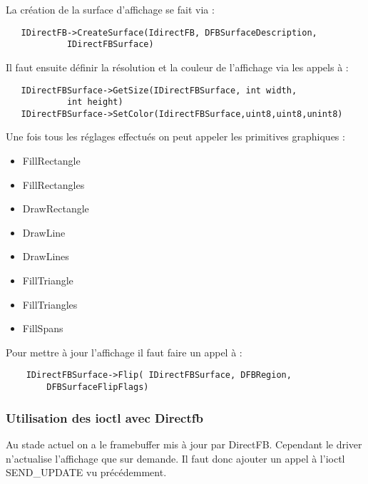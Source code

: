 La création de la surface d'affichage se fait via : 
	\begin{lstlisting}
   IDirectFB->CreateSurface(IdirectFB, DFBSurfaceDescription, 
			IDirectFBSurface)
	\end{lstlisting}

Il faut ensuite définir la résolution et la couleur de l'affichage via les appels à :
	\begin{lstlisting}
   IDirectFBSurface->GetSize(IDirectFBSurface, int width, 
			int height)
   IDirectFBSurface->SetColor(IdirectFBSurface,uint8,uint8,unint8)
	\end{lstlisting}

Une fois tous les réglages effectués on peut appeler les primitives graphiques : 
\begin{itemize}
	\item FillRectangle
	\item FillRectangles
	\item DrawRectangle
	\item DrawLine
	\item DrawLines
	\item FillTriangle
	\item FillTriangles
	\item FillSpans
\end{itemize}

Pour mettre à jour l'affichage il faut faire un appel à : 
	\begin{lstlisting}
	IDirectFBSurface->Flip( IDirectFBSurface, DFBRegion,
		DFBSurfaceFlipFlags)
	\end{lstlisting}




\subsubsection{Utilisation des ioctl avec Directfb}

Au stade actuel on a le framebuffer mis à jour par DirectFB. Cependant le driver n'actualise l'affichage que sur demande.
Il faut donc ajouter un appel à l'ioctl SEND_UPDATE vu précédemment.

